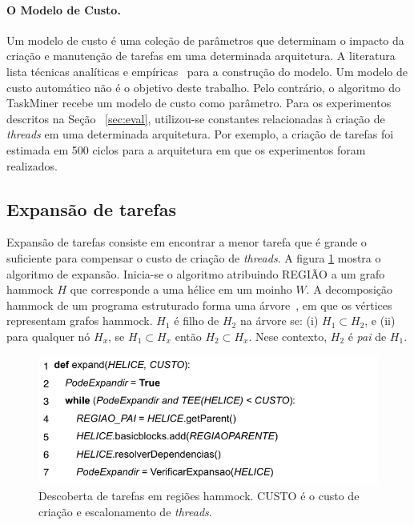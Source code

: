 \documentclass[sigplan,10pt,review]{acmart}
\newcommand\Taskminer{\mbox{\textsf{TaskMiner}}}
\begin{document}
\paragraph{O Modelo de Custo.}
Um modelo de custo é uma coleção de parâmetros que determinam o impacto
da criação e manutenção de tarefas em uma determinada arquitetura.
A literatura lista técnicas analíticas e empíricas~\cite{Poesia17}
para a construção do modelo. Um modelo de custo automático não é o objetivo deste trabalho.
Pelo contrário, o algoritmo do {\Taskminer} recebe um modelo de custo como parâmetro.
Para os experimentos descritos na Seção ~\ref{sec:eval}, utilizou-se constantes
relacionadas à criação de {\em threads} em uma determinada arquitetura. Por exemplo,
a criação de tarefas foi estimada em 500 ciclos para a arquitetura em que os experimentos
foram realizados.

\subsection{Expansão de tarefas}
\label{sub:expansion}

Expansão de tarefas consiste em encontrar a menor tarefa que é grande o suficiente
para compensar o custo de criação de {\em threads}. A figura \ref{fig:expand_alg}
mostra o algoritmo de expansão. Inicia-se o algoritmo atribuindo \textsf{REGIÃO} a
um grafo hammock $H$ que corresponde a uma hélice em um moinho $W$.
A decomposição hammock de um programa estruturado forma uma árvore~\cite{Ferrante87},
em que os vértices representam grafos hammock.
$H_1$ é filho de $H_2$ na árvore se:
(i) $H_1 \subset H_2$, e (ii) para qualquer 
nó $H_x$, se $H_1 \subset H_x$ então $H_2 \subset H_x$.
Nese contexto, $H_2$ é {\em pai} de $H_1$.

\begin{figure}[h]
\begin{center}
\includegraphics[width=1\columnwidth]{images/expand_alg}
\caption{Descoberta de tarefas em regiões hammock.
\textsf{CUSTO} é o custo de criação e escalonamento de {\em threads}.}
\label{fig:expand_alg}
\end{center}
\end{figure}
\end{document}
